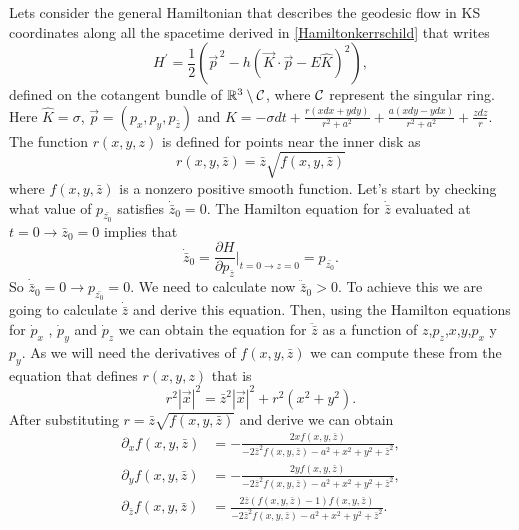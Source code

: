 \begin{Proof}Lets consider the general Hamiltonian that describes the geodesic flow in \gls{KS} coordinates along all the spacetime derived in \vref{Hamiltonkerrschild} that writes
\begin{equation}
H^{\prime} = \frac{1}{2} \left( \vec{p}^{\,2}- h \left( \vec{K} \cdot \vec{p} - E  \hat{K} \right)^2 \right),
\end{equation} 
defined on the cotangent bundle of $\mathbb{R}^{3} \setminus {\mathcal C}$, where ${\mathcal C}$ represent the singular ring. Here $\hat{K}=\sigma$, $\vec{p}=(p_x,p_y,p_{\bar{z}})$ and $K=-\sigma dt + \frac{r(x dx+y dy)}{r^2+a^2} + \frac{a(x dy-y dx)}{r^2+a^2}+\frac{z dz}{r}$. The function $r(x,y,z)$ is defined for points near the inner disk as
\begin{equation}
 r(x,y,\bar{z})=\bar{z} \sqrt{f(x,y,\bar{z})}
\end{equation}
where $f(x,y,\bar{z})$ is a nonzero positive smooth function. Let's start by checking what value of $p_{\bar{z_0}}$ satisfies $\dot{\bar{z}}_0=0$. The Hamilton equation for $\dot{\bar{z}}$ evaluated at $t=0 \to \bar{z}_0=0$ implies that
\begin{equation}
\dot{\bar{z}}_0=\frac{\partial H}{\partial p_{\bar{z}}}|_{t=0 \to z=0}=p_{\bar{z_0}}.
\end{equation}
So $\dot{\bar{z}}_0=0 \rightarrow p_{\bar{z_0}}=0$. We need to calculate now $\ddot{\bar{z}}_0>0$. To achieve this we are going to calculate $\dot{\bar{z}}$ and derive this equation. Then, using the Hamilton equations for $\dot{p}_x$ , $\dot{p}_y$ and $\dot{p}_z$ we can obtain the equation for $\ddot{\bar{z}}$ as a function of $z$,$p_z$,$x$,$y$,$p_x$ y $p_y$. As we will need the derivatives of $f(x,y,\bar{z})$ we can compute these from the equation that defines $r(x,y,z)$ that is
\begin{equation}
r^2 |\vec{x}|^2=\bar{z}^2 |\vec{x}|^2+r^2 \left(x^2+y^2\right).
\end{equation}
After substituting $r= \bar{z} \sqrt{f(x,y,\bar{z})}$ and derive we can obtain
\begin{align}
 \partial_x f(x,y,\bar{z})&=-\frac{2 x f(x,y,\bar{z})}{-2 \bar{z}^2 f(x,y,\bar{z})-a^2+x^2+y^2+\bar{z}^2},\\
 \partial_y f(x,y,\bar{z})&=-\frac{2 y f(x,y,\bar{z})}{-2 \bar{z}^2 f(x,y,\bar{z})-a^2+x^2+y^2+\bar{z}^2},\\
  \partial_{\bar{z}} f(x,y,\bar{z})&=\frac{2 \bar{z} (f(x,y,\bar{z})-1) f(x,y,\bar{z})}{-2 \bar{z}^2 f(x,y,\bar{z})-a^2+x^2+y^2+\bar{z}^2}.
\end{align}

\end{Proof}
